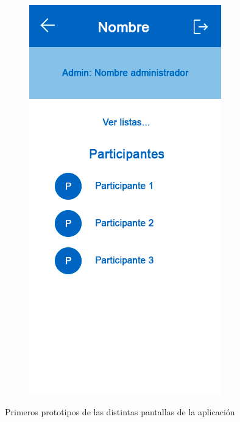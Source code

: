 \documentclass{article}
\begin{document}
\begin{figure}[htbp]
\begin{subfigure}[h]{0.3\textwidth}
    \end{subfigure}
    \hfill
    \begin{subfigure}[h]{0.3\textwidth}
        \includegraphics[width=\textwidth]{imagenes/modelos/info.png}
    \end{subfigure}
    
    \caption{Primeros prototipos de las distintas pantallas de la aplicación}
\end{figure}
\end{document}
